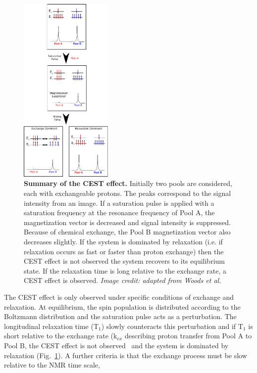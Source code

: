 \begin{figure}[htbp]
\begin{center}
\includegraphics[width=0.4\textwidth]{cest/cest-images/cest_saturation.pdf}
\caption{\textbf{Summary of the CEST effect.} Initially two pools are considered, each with exchangeable protons.
The peaks correspond to the signal intensity from an image.
If a saturation pulse is applied with a saturation frequency at the resonance frequency of Pool A, the magnetization vector is decreased and signal intensity is suppressed.
Because of chemical exchange, the Pool B magnetization vector also decreases slightly.
If the system is dominated by relaxation (i.e.
if relaxation occurs as fast or faster than proton exchange) then the CEST effect is not observed the system recovers to its equilibrium state.
If the relaxation time is long relative to the exchange rate, a CEST effect is observed.
\newline \emph{\small{Image credit: adapted from Woods et al.~\cite{Woods:2006cq}}}}
\label{saturation}
\end{center}
\end{figure}
	
The CEST effect is only observed under specific conditions of exchange and relaxation.
At equilibrium, the spin population is distributed according to the Boltzmann distribution and the saturation pulse acts as a perturbation.
The longitudinal relaxation time (T$_1$) slowly counteracts this perturbation and if T$_1$ is short relative to the exchange rate (k$_{ex}$ describing proton transfer from Pool A to Pool B, the CEST effect is not observed~\cite{Woods:2006cq} and the system is dominated by relaxation (Fig.~\ref{saturation}).
A further criteria is that the exchange process must be slow relative to the NMR time scale,
	
